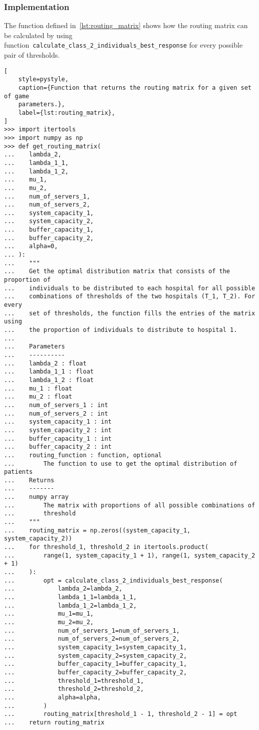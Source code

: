 \subsubsection{Implementation}\label{sec:implementation_distribution_service}

The function defined in~\ref{lst:routing_matrix} shows how the routing matrix
can be calculated by using
function~\texttt{calculate\_class\_2\_individuals\_best\_response}
for every possible pair of thresholds.

\begin{lstlisting}[
    style=pystyle,
    caption={Function that returns the routing matrix for a given set of game
    parameters.},
    label={lst:routing_matrix},
]
>>> import itertools
>>> import numpy as np
>>> def get_routing_matrix(
...    lambda_2,
...    lambda_1_1,
...    lambda_1_2,
...    mu_1,
...    mu_2,
...    num_of_servers_1,
...    num_of_servers_2,
...    system_capacity_1,
...    system_capacity_2,
...    buffer_capacity_1,
...    buffer_capacity_2,
...    alpha=0,
... ):
...    """
...    Get the optimal distribution matrix that consists of the proportion of
...    individuals to be distributed to each hospital for all possible
...    combinations of thresholds of the two hospitals (T_1, T_2). For every
...    set of thresholds, the function fills the entries of the matrix using
...    the proportion of individuals to distribute to hospital 1.
...
...    Parameters
...    ----------
...    lambda_2 : float
...    lambda_1_1 : float
...    lambda_1_2 : float
...    mu_1 : float
...    mu_2 : float
...    num_of_servers_1 : int
...    num_of_servers_2 : int
...    system_capacity_1 : int
...    system_capacity_2 : int
...    buffer_capacity_1 : int
...    buffer_capacity_2 : int
...    routing_function : function, optional
...        The function to use to get the optimal distribution of patients
...    Returns
...    -------
...    numpy array
...        The matrix with proportions of all possible combinations of
...        threshold
...    """
...    routing_matrix = np.zeros((system_capacity_1, system_capacity_2))
...    for threshold_1, threshold_2 in itertools.product(
...        range(1, system_capacity_1 + 1), range(1, system_capacity_2 + 1)
...    ):
...        opt = calculate_class_2_individuals_best_response(
...            lambda_2=lambda_2,
...            lambda_1_1=lambda_1_1,
...            lambda_1_2=lambda_1_2,
...            mu_1=mu_1,
...            mu_2=mu_2,
...            num_of_servers_1=num_of_servers_1,
...            num_of_servers_2=num_of_servers_2,
...            system_capacity_1=system_capacity_1,
...            system_capacity_2=system_capacity_2,
...            buffer_capacity_1=buffer_capacity_1,
...            buffer_capacity_2=buffer_capacity_2,
...            threshold_1=threshold_1,
...            threshold_2=threshold_2,
...            alpha=alpha,
...        )
...        routing_matrix[threshold_1 - 1, threshold_2 - 1] = opt
...    return routing_matrix

\end{lstlisting}

